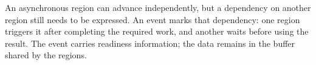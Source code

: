 An asynchronous region can advance independently, but a dependency on another region still needs to be expressed. An event marks that dependency: one region triggers it after completing the required work, and another waits before using the result. The event carries readiness information; the data remains in the buffer shared by the regions.

